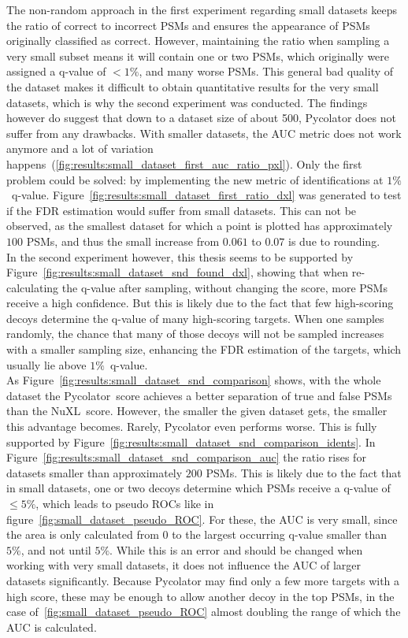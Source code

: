 The non-random approach in the first experiment regarding small datasets keeps the ratio of correct to incorrect PSMs and ensures the appearance of PSMs originally classified as correct. However, maintaining the ratio when sampling a very small subset means it will contain one or two PSMs, which originally were assigned a q-value of $<1\%$, and many worse PSMs. This general bad quality of the dataset makes it difficult to obtain quantitative results for the very small datasets, which is why the second experiment was conducted. The findings however do suggest that down to a dataset size of about 500, Pycolator does not suffer from any drawbacks. With smaller datasets, the AUC metric does not work anymore and a lot of variation happens~(\ref{fig:results:small_dataset_first_auc_ratio_pxl}). Only the first problem could be solved: by implementing the new metric of identifications at $1\%$~q-value. Figure~\ref{fig:results:small_dataset_first_ratio_dxl} was generated to test if the FDR estimation would suffer from small datasets. This can not be observed, as the smallest dataset for which a point is plotted has approximately $100$ PSMs, and thus the small increase from $0.061$ to $0.07$ is due to rounding.\\
In the second experiment however, this thesis seems to be supported by Figure~\ref{fig:results:small_dataset_snd_found_dxl}, showing that when re-calculating the q-value after sampling, without changing the score, more PSMs receive a high confidence. But this is likely due to the fact that few high-scoring decoys determine the q-value of many high-scoring targets. When one samples randomly, the chance that many of those decoys will not be sampled increases with a smaller sampling size, enhancing the FDR estimation of the targets, which usually lie above $1\%$~q-value.\\
As Figure~\ref{fig:results:small_dataset_snd_comparison} shows, with the whole dataset the Pycolator~score achieves a better separation of true and false PSMs than the NuXL~score. However, the smaller the given dataset gets, the smaller this advantage becomes. Rarely, Pycolator even performs worse. This is fully supported by Figure~\ref{fig:results:small_dataset_snd_comparison_idents}. In Figure~\ref{fig:results:small_dataset_snd_comparison_auc} the ratio rises for datasets smaller than approximately $200$ PSMs. This is likely due to the fact that in small datasets, one or two decoys determine which PSMs receive a q-value of $\leq5\%$, which leads to pseudo ROCs like in figure~\ref{fig:small_dataset_pseudo_ROC}. For these, the AUC is very small, since the area is only calculated from $0$ to the largest occurring q-value smaller than $5\%$, and not until $5\%$. While this is an error and should be changed when working with very small datasets, it does not influence the AUC of larger datasets significantly. Because Pycolator may find only a few more targets with a high score, these may be enough to allow another decoy in the top PSMs, in the case of~\ref{fig:small_dataset_pseudo_ROC} almost doubling the range of which the AUC is calculated.\\
